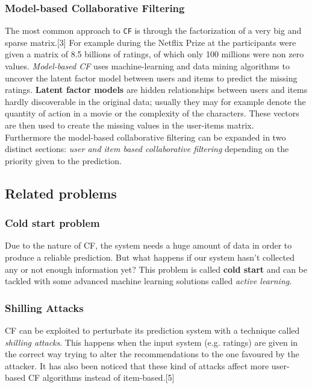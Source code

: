 \documentclass{sig-alternate-05-2015}
\begin{document}
\subsubsection{Model-based Collaborative Filtering}
The most common approach to \texttt{CF} is through the factorization
of a very big and sparse matrix.[3] For example during the Netflix
Prize at the participants were given a matrix of 8.5 billions of ratings,
of which only 100 millions were non zero values.
\textit{Model-based CF} uses machine-learning and data mining algorithms
to uncover the latent factor model between users and items to
predict the missing ratings. \textbf{Latent factor models} are hidden
relationships between users and items hardly discoverable in the original data;
usually they may for example denote the quantity of action in a movie or the complexity
of the characters. These vectors are then used to create the missing values in the user-items
matrix.\\


Furthermore the model-based collaborative filtering can be expanded in two distinct sections:
\textit{user and item based collaborative filtering} depending on the priority given to the
prediction.


\subsection{Related problems}
\subsubsection{Cold start problem}
Due to the nature of CF, the system needs a huge amount of data
in order to produce a reliable prediction. But what happens if our system
hasn't collected any or not enough information yet?
This problem is called \textbf{cold start} and can be tackled with some advanced
machine learning solutions called \textit{active learning}.

\subsubsection{Shilling Attacks}
CF can be exploited to perturbate its prediction system with a technique
called \textit{shilling attacks}. This happens when the input system (e.g. ratings)
are given in the correct way trying to alter the recommendations to the one
favoured by the attacker. It has also been noticed that these kind of attacks affect
more user-based CF algorithms instead of item-based.[5]
\end{document}
